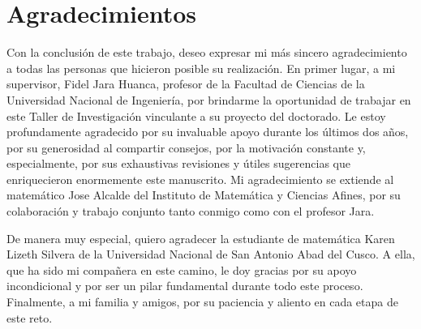 \chapter*{Agradecimientos}

Con la conclusión de este trabajo, deseo expresar mi más sincero
agradecimiento a todas las personas que hicieron posible su
realización.
En primer lugar, a mi supervisor, Fidel Jara Huanca, profesor de la
Facultad de Ciencias de la Universidad Nacional de Ingeniería, por
brindarme la oportunidad de trabajar en este Taller de Investigación
vinculante a su proyecto del doctorado.
Le estoy profundamente agradecido por su invaluable apoyo durante los
últimos dos años, por su generosidad al compartir consejos, por la
motivación constante y, especialmente, por sus exhaustivas revisiones
y útiles sugerencias que enriquecieron enormemente este manuscrito.
Mi agradecimiento se extiende al matemático Jose Alcalde del
Instituto de Matemática y Ciencias Afines, por su colaboración y
trabajo conjunto tanto conmigo como con el profesor Jara.

De manera muy especial, quiero agradecer la estudiante de matemática
Karen Lizeth Silvera de la Universidad Nacional de San Antonio Abad
del Cusco.
A ella, que ha sido mi compañera en este camino, le doy gracias por
su apoyo incondicional y por ser un pilar fundamental durante todo
este proceso.
Finalmente, a mi familia y amigos, por su paciencia y aliento en cada
etapa de este reto.
